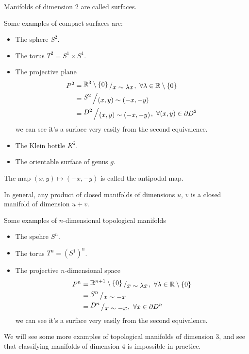\documentclass[11pt,a4paper]{article}
\begin{document}
\begin{remark}
  Manifolds of dimension $2$ are called surfaces.
\end{remark}

Some examples of compact surfaces are:
\begin{itemize}
  \item The sphere $S^2$.
  \item The torus $T^2 = S^1 \times S^1$.
  \item The projective plane
    \begin{align*}
      P^2 &= \bigslant{\R^3 \setminus \set{0}}{x \sim \lambda x},\ 
        \forall \lambda \in \R \setminus \set{0} \\
      &= \bigslant{S^2}{(x,y) \sim (-x,-y)} \\
      &= \bigslant{D^2}{(x,y) \sim (-x,-y)},\ \forall (x,y) \in \partial D^2
    \end{align*}
  we can see it's a surface very easily from the second equivalence.
  \item The Klein bottle $K^2$.
  \item The orientable surface of genus $g$.
\end{itemize}
\begin{remark}
  The map $(x,y) \mapsto (-x,-y)$ is called the antipodal map.
\end{remark}
\begin{remark}
    In general, any product of closed manifolds of dimensions
    $u$, $v$ is a closed manifold of dimension $u + v$.
\end{remark}


Some examples of $n$-dimensional topological manifolds
\begin{itemize}
  \item The spehre $S^n$.
  \item The torus $T^n = (S^1)^n$.
  \item The projective $n$-dimensional space
    \begin{align*}
      P^n &= \bigslant{\R^{n+1} \setminus \set{0}}{x \sim \lambda x},\ 
        \forall \lambda \in \R \setminus \set{0} \\
      &= \bigslant{S^n}{x \sim -x} \\
      &= \bigslant{D^n}{x \sim -x},\ \forall x \in \partial D^n
    \end{align*}
  we can see it's a surface very easily from the second equivalence.
\end{itemize}
We will see some more examples of topological manifolds of dimension
$3$, and see that classifying manifolds of dimension $4$ is impossible
in practice.
\end{document}
